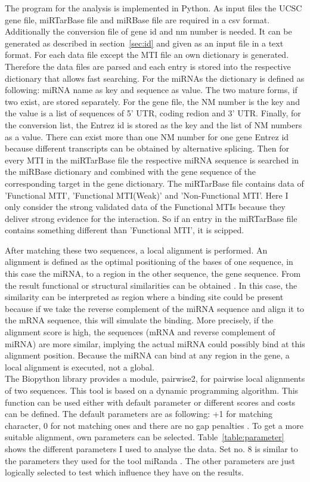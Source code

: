 \documentclass[12pt]{article}
\begin{document}
The program for the analysis is implemented in Python. As input files the UCSC gene file, miRTarBase file and miRBase file are required in a csv format. Additionally the conversion file of gene id and nm number is needed. It can be generated as described in section~\ref{sec:id} and given as an input file in a text format. 
For each data file except the MTI file an own dictionary is generated. Therefore the data files are parsed and each entry is stored into the respective dictionary that allows fast searching. For the miRNAs the dictionary is defined as following: miRNA name as key and sequence as value. The two mature forms, if two exist, are stored separately. For the gene file, the NM number is the key and the value is a list of sequences of 5' UTR, coding redion and 3' UTR. Finally, for the conversion list, the Entrez id is stored as the key and the list of NM numbers as a value. There can exist more than one NM number for one gene Entrez id because different transcripts can be obtained by alternative splicing. 
Then for every MTI in the miRTarBase file the respective miRNA sequence is searched in the miRBase dictionary and combined with the gene sequence of the corresponding target in the gene dictionary. The miRTarBase file contains data of 'Functional MTI', 'Functional MTI(Weak)' and 'Non-Functional MTI'. Here I only consider the strong validated data of the Functional MTIs because they deliver strong evidence for the interaction. So if an entry in the miRTarBase file contains something different than 'Functional MTI', it is scipped.

After matching these two sequences, a local alignment is performed. An alignment is defined as the optimal positioning of the bases of one sequence, in this case the miRNA, to a region in the other sequence, the gene sequence. From the result functional or structural similarities can be obtained \cite{alignment}. In this case, the similarity can be interpreted as region where a binding site could be present because if we take the reverse complement of the miRNA sequence and align it to the mRNA sequence, this will simulate the binding. More precisely, if the alignment score is high, the sequences (mRNA and reverse complement of miRNA) are more similar, implying the actual miRNA could possibly bind at this alignment position. Because the miRNA can bind at any region in the gene, a local alignment is executed, not a global.\\

The Biopython library provides a module, pairwise2, for pairwise local alignments of two sequences. This tool is based on a dynamic programming algorithm. This function can be used either with default parameter or different scores and costs can be defined. The default parameters are as following: +1 for matching character, 0 for not matching ones and there are no gap penalties \cite{pairwise}. To get a more suitable alignment, own parameters can be selected. Table~\ref{table:parameter} shows the different parameters I used to analyse the data. Set no. 8 is similar to the parameters they used for the tool miRanda \cite{Enright}. The other parameters are just logically selected to test which influence they have on the results.
\end{document}
